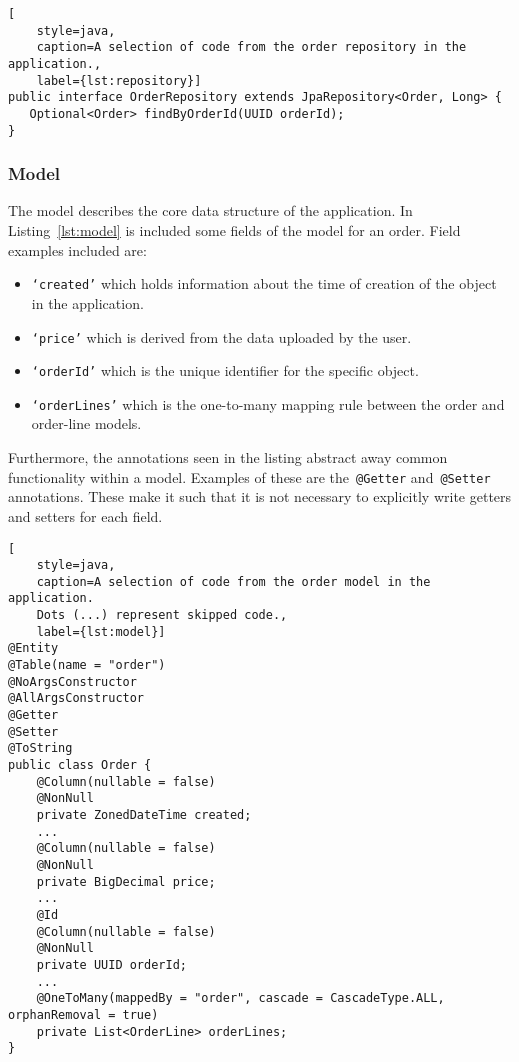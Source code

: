 \begin{lstlisting}[
    style=java,
    caption=A selection of code from the order repository in the application.,
    label={lst:repository}]
public interface OrderRepository extends JpaRepository<Order, Long> {
   Optional<Order> findByOrderId(UUID orderId);
}
\end{lstlisting}

\subsubsection{Model}

The model describes the core data structure of the application.
In Listing~\ref{lst:model} is included some fields of the model for an order.
Field examples included are:

\begin{itemize}
    \item \texttt{`created'} which holds information about the time of creation of the object in the application.

    \item \texttt{`price'} which is derived from the data uploaded by the user.

    \item \texttt{`orderId'} which is the unique identifier for the specific object.

    \item \texttt{`orderLines'} which is the one-to-many mapping rule between the order and order-line models.
\end{itemize}

Furthermore, the annotations seen in the listing abstract away common functionality within a model.
Examples of these are the~\texttt{@Getter} and~\texttt{@Setter} annotations.
These make it such that it is not necessary to explicitly write getters and setters for each field.

\begin{lstlisting}[
    style=java,
    caption=A selection of code from the order model in the application.
    Dots (...) represent skipped code.,
    label={lst:model}]
@Entity
@Table(name = "order")
@NoArgsConstructor
@AllArgsConstructor
@Getter
@Setter
@ToString
public class Order {
    @Column(nullable = false)
    @NonNull
    private ZonedDateTime created;
    ...
    @Column(nullable = false)
    @NonNull
    private BigDecimal price;
    ...
    @Id
    @Column(nullable = false)
    @NonNull
    private UUID orderId;
    ...
    @OneToMany(mappedBy = "order", cascade = CascadeType.ALL, orphanRemoval = true)
    private List<OrderLine> orderLines;
}
\end{lstlisting}

